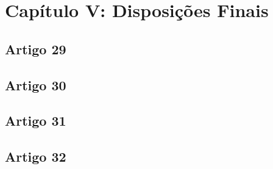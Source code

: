 \section{Capítulo V: Disposições Finais}

\subsection{Artigo 29}


\subsection{Artigo 30}


\subsection{Artigo 31}


\subsection{Artigo 32}
